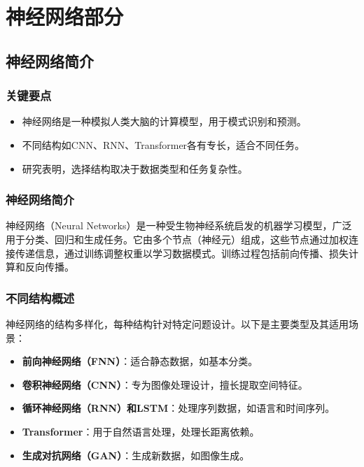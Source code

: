 \documentclass[UTF8]{report}
\theoremstyle{MyLineTheoremStyle} %
\theoremstyle{MyBlockTheoremStyle} %
\theoremstyle{MySubsubsectionStyle} %
\begin{document}
    \newpage    



\chapter{神经网络部分}

\section{神经网络简介}

\subsection{关键要点}
\begin{itemize}
    \item 神经网络是一种模拟人类大脑的计算模型，用于模式识别和预测。
    \item 不同结构如CNN、RNN、Transformer各有专长，适合不同任务。
    \item 研究表明，选择结构取决于数据类型和任务复杂性。
\end{itemize}

\subsection{神经网络简介}
神经网络（Neural Networks）是一种受生物神经系统启发的机器学习模型，广泛用于分类、回归和生成任务。它由多个节点（神经元）组成，这些节点通过加权连接传递信息，通过训练调整权重以学习数据模式。训练过程包括前向传播、损失计算和反向传播。

\subsection{不同结构概述}
神经网络的结构多样化，每种结构针对特定问题设计。以下是主要类型及其适用场景：
\begin{itemize}
    \item \textbf{前向神经网络（FNN）}：适合静态数据，如基本分类。
    \item \textbf{卷积神经网络（CNN）}：专为图像处理设计，擅长提取空间特征。
    \item \textbf{循环神经网络（RNN）和LSTM}：处理序列数据，如语言和时间序列。
    \item \textbf{Transformer}：用于自然语言处理，处理长距离依赖。
    \item \textbf{生成对抗网络（GAN）}：生成新数据，如图像生成。
\end{itemize}
\end{document}
